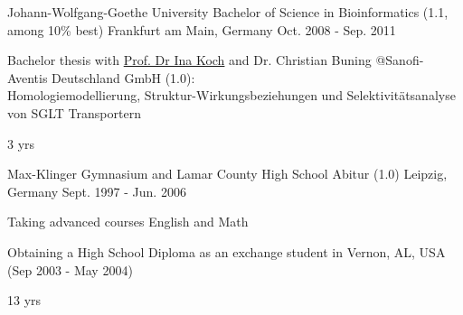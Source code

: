 \begin{cventries}
  \cventrynew
    {Johann-Wolfgang-Goethe University } %
    {Bachelor of Science in Bioinformatics (1.1, among 10\% best)} %
    {Frankfurt am Main, Germany} %
    {Oct. 2008 - Sep. 2011} %
    {
      \begin{cvitems} %
        \item {Bachelor thesis with \href{mailto:ina.koch@bioinformatik.uni-frankfurt.de}{Prof. Dr Ina Koch} and Dr. Christian Buning  @Sanofi-Aventis Deutschland GmbH (1.0):\\Homologiemodellierung, Struktur-Wirkungsbeziehungen und Selektivitätsanalyse von SGLT Transportern}
      \end{cvitems}
    }
    {3 yrs}


  \cventrynew
    {Max-Klinger Gymnasium and Lamar County High School} %
    {Abitur (1.0) } %
    {Leipzig, Germany} %
    {Sept. 1997 - Jun. 2006} %
    {
    \begin{cvitems}
	    \item {Taking advanced courses English and Math}
    	\item {Obtaining a High School Diploma as an exchange student in Vernon, AL, USA (Sep 2003 - May 2004)}
    \end{cvitems}
    }
    {13 yrs}

    
\end{cventries}
